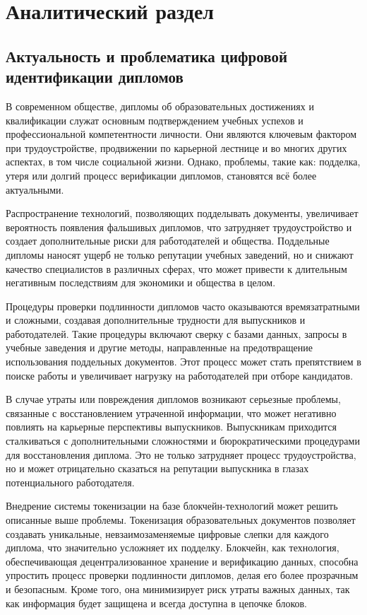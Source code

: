 \section{Аналитический раздел}
\label{sec:analytics}

\subsection{Актуальность и проблематика цифровой идентификации дипломов}

В современном обществе, дипломы об образовательных достижениях и квалификации служат основным подтверждением учебных успехов и профессиональной компетентности личности. Они являются ключевым фактором при трудоустройстве, продвижении по карьерной лестнице и во многих других аспектах, в том числе социальной жизни. Однако, проблемы, такие как: подделка, утеря или долгий процесс верификации дипломов, становятся всё более актуальными.

Распространение технологий, позволяющих подделывать документы, увеличивает вероятность появления фальшивых дипломов, что затрудняет трудоустройство и создает дополнительные риски для работодателей и общества. Поддельные дипломы наносят ущерб не только репутации учебных заведений, но и снижают качество специалистов в различных сферах, что может привести к длительным негативным последствиям для экономики и общества в целом.~\cite{bib:if_fake_diploma, bib:tzh_fake_diploma}

Процедуры проверки подлинности дипломов часто оказываются времязатратными и сложными, создавая дополнительные трудности для выпускников и работодателей. Такие процедуры включают сверку с базами данных, запросы в учебные заведения и другие методы, направленные на предотвращение использования поддельных документов. Этот процесс может стать препятствием в поиске работы и увеличивает нагрузку на работодателей при отборе кандидатов.~\cite{bib:diploma_check}

В случае утраты или повреждения дипломов возникают серьезные проблемы, связанные с восстановлением утраченной информации, что может негативно повлиять на карьерные перспективы выпускников. Выпускникам приходится сталкиваться с дополнительными сложностями и бюрократическими процедурами для восстановления диплома. Это не только затрудняет процесс трудоустройства, но и может отрицательно сказаться на репутации выпускника в глазах потенциального работодателя.~\cite{bib:cp_diploma_reissue, bib:iz_diploma_reissue}

Внедрение системы токенизации на базе блокчейн-технологий может решить описанные выше проблемы. Токенизация образовательных документов позволяет создавать уникальные, невзаимозаменяемые цифровые слепки для каждого диплома, что значительно усложняет их подделку. Блокчейн, как технология, обеспечивающая децентрализованное хранение и верификацию данных, способна упростить процесс проверки подлинности дипломов, делая его более прозрачным и безопасным. Кроме того, она минимизирует риск утраты важных данных, так как информация будет защищена и всегда доступна в цепочке блоков.~\cite{bib:tadviser_digital_diploma}

